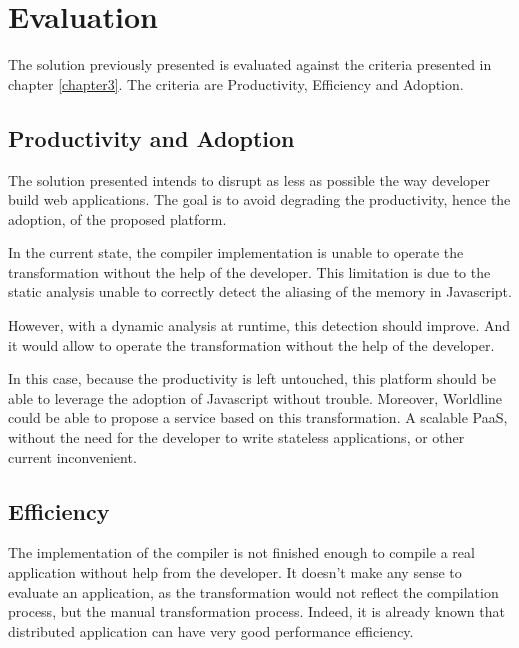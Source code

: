 \section{Evaluation} \label{chapter4:evaluation}

The solution previously presented is evaluated against the criteria presented in chapter \ref{chapter3}.
The criteria are Productivity, Efficiency and Adoption.

\subsection{Productivity and Adoption}

The solution presented intends to disrupt as less as possible the way developer build web applications.
The goal is to avoid degrading the productivity, hence the adoption, of the proposed platform.

In the current state, the compiler implementation is unable to operate the transformation without the help of the developer.
This limitation is due to the static analysis unable to correctly detect the aliasing of the memory in Javascript.

However, with a dynamic analysis at runtime, this detection should improve.
And it would allow to operate the transformation without the help of the developer.

In this case, because the productivity is left untouched, this platform should be able to leverage the adoption of Javascript without trouble.
Moreover, Worldline could be able to propose a service based on this transformation.
A scalable PaaS, without the need for the developer to write stateless applications, or other current inconvenient.


\subsection{Efficiency}

The implementation of the compiler is not finished enough to compile a real application without help from the developer.
It doesn't make any sense to evaluate an application, as the transformation would not reflect the compilation process, but the manual transformation process.
Indeed, it is already known that distributed application can have very good performance efficiency.

